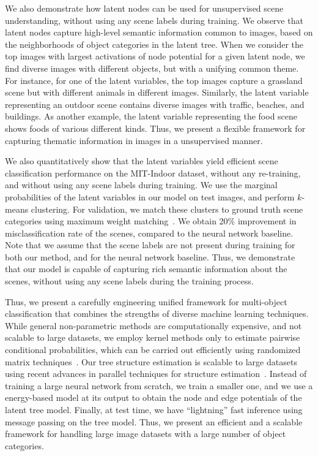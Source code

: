 \documentclass{article}
\begin{document}
We also demonstrate how   latent nodes can be used for unsupervised scene understanding, without using any scene labels during training. We observe that latent nodes capture high-level semantic information   common to images, based on the   neighborhoods of object categories in the latent tree.  When we consider the top  images with largest activations of node potential for a given latent node, we find diverse images with different objects, but with a unifying  common theme. For instance, for one of the latent variables, the top images capture  a grassland scene but with  different animals in different images.  Similarly,  the latent variable representing an outdoor scene contains diverse images with traffic, beaches, and buildings. As another example, the latent variable representing the food scene shows foods of various different kinds. Thus, we present a flexible framework for capturing thematic information in images in a unsupervised manner.

We also  quantitatively show that the latent variables yield efficient scene classification performance on the  MIT-Indoor dataset, without any re-training, and without using any scene labels during   training. We use the marginal probabilities  of the latent variables in our model on   test images, and perform $k$-means clustering. For validation, we match these clusters to ground truth scene categories using maximum weight matching~\cite{ahuja1989network}. We obtain 20\% improvement in misclassification rate of the scenes, compared to the neural network baseline. Note that we assume that the scene labels are not present during training for both our method, and for the neural network baseline. Thus, we demonstrate that our model is capable of capturing rich semantic information about the scenes, without using any scene labels during the training process.

Thus, we present a carefully engineering unified framework for multi-object classification that combines the strengths of diverse machine learning techniques. While general non-parametric methods are computationally expensive, and not scalable to large datasets, we employ kernel methods only to estimate pairwise conditional probabilities, which can be carried out efficiently using randomized matrix techniques~\cite{nystorm}. Our tree structure estimation is scalable to large datasets using recent advances in parallel techniques for structure estimation~\cite{scalableLTM}. Instead of training a large neural network from scratch, we train a smaller one, and we use a energy-based model at its output to  obtain the node and edge potentials of the latent tree model. Finally, at test time, we have ``lightning'' fast inference using message passing on the tree model. Thus, we present an efficient and  a scalable framework for handling large image datasets with a large number of object categories.
\end{document}
